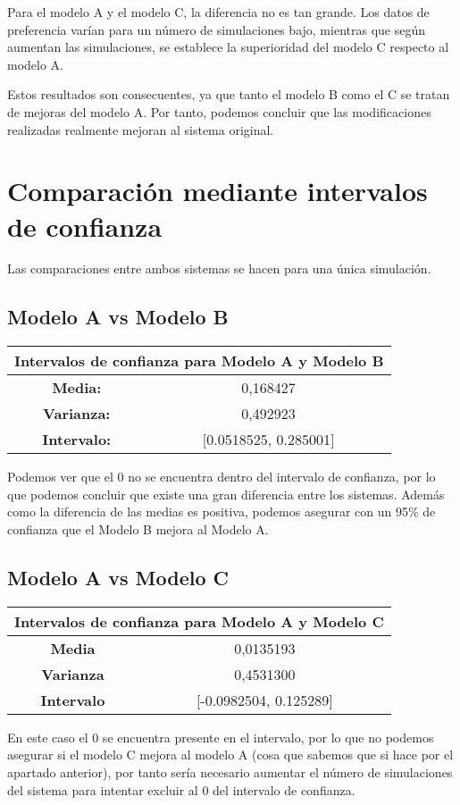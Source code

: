 Para el modelo A y el modelo C, la diferencia no es tan grande. Los datos de preferencia varían para un número de simulaciones bajo, mientras que según aumentan las simulaciones, se establece la superioridad del modelo C respecto al modelo A.

Estos resultados son consecuentes, ya que tanto el modelo B como el C se tratan de mejoras del modelo A. Por tanto, podemos concluir que las modificaciones realizadas realmente mejoran al sistema original.

\newpage

\section{Comparación mediante intervalos de confianza}

Las comparaciones entre ambos sistemas se hacen para una única simulación.

\subsection{Modelo A vs Modelo B}
\begin{table}[H]
\centering
\begin{tabular}{|c|c|}
\hline
\multicolumn{2}{|c|}{\textbf{Intervalos de confianza para Modelo A y Modelo B}} \\ \hline
\textbf{Media:} & 0,168427 \\ \hline
\textbf{Varianza:} & 0,492923 \\ \hline
\textbf{Intervalo:} & {[}0.0518525, 0.285001{]} \\ \hline
\end{tabular}
\end{table}

Podemos ver que el 0 no se encuentra dentro del intervalo de confianza, por lo que podemos concluir que existe una gran diferencia entre los sistemas. Además como la diferencia de las medias es positiva, podemos asegurar con un 95\% de confianza que el Modelo B mejora al Modelo A.

\subsection{Modelo A vs Modelo C}

\begin{table}[H]
\centering
\begin{tabular}{|c|c|}
\hline
\multicolumn{2}{|c|}{\textbf{Intervalos de confianza para Modelo A y Modelo C}} \\ \hline
\textbf{Media} & 0,0135193 \\ \hline
\textbf{Varianza} & 0,4531300 \\ \hline
\textbf{Intervalo} & {[}-0.0982504, 0.125289{]} \\ \hline
\end{tabular}
\end{table}

En este caso el 0 se encuentra presente en el intervalo, por lo que no podemos asegurar si el modelo C mejora al modelo A (cosa que sabemos que si hace por el apartado anterior), por tanto sería necesario aumentar el número de simulaciones del sistema para intentar excluir al 0 del intervalo de confianza.
